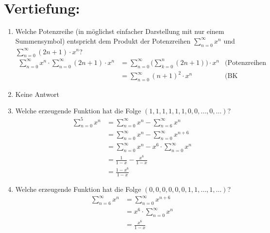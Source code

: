 



    \maketitle
    \section*{Vertiefung:}
    \begin{enumerate}[label=(\alph*)]
        \item Welche Potenzreihe (in möglichst einfacher Darstellung mit nur einem Summensymbol) 
        entspricht dem Produkt der Potenzreihen $\displaystyle\sum_{n=0}^{\infty} x^n$ und 
        $\displaystyle\sum_{n=0}^{\infty} (2n+1)\cdot x^n$?\\
        \begin{align*}
            \sum_{n=0}^{\infty} x^n \cdot \sum_{n=0}^{\infty} (2n+1)\cdot x^n &= 
            \sum_{n=0}^{\infty} \Bigg(\sum_{k=0}^{n} (2n+1)\Bigg) \cdot x^n &\textrm{(Potenzreihen Rechnenregeln)}\\
            &= \sum_{n=0}^{\infty} (n+1)^2 \cdot x^n &\textrm{(BK Proposition 3.B)}
        \end{align*}

        \item Keine Antwort

        \item Welche erzeugende Funktion hat die Folge $(1, 1, 1, 1, 1, 1, 0, 0, \ldots , 0, \ldots)$?
        \begin{align*}
            \sum_{n=0}^{5} x^n
            &=\sum_{n=0}^{\infty} x^n - \sum_{n=6}^{\infty} x^n \\
            &=\sum_{n=0}^{\infty} x^n - \sum_{n=0}^{\infty} x^{n+6} \\
            &=\sum_{n=0}^{\infty} x^n - x^6 \cdot \sum_{n=0}^{\infty} x^n \\
            &=\frac{1}{1-x} - \frac{x^6}{1-x} \\
            &=\frac{1-x^6}{1-x}
        \end{align*}

        \item Welche erzeugende Funktion hat die Folge $(0, 0, 0, 0, 0, 0, 1, 1, \ldots , 1,\ldots)$?
        \begin{align*}
            \sum_{n=6}^{\infty} x^n
            &=\sum_{n=0}^{\infty} x^{n+6} \\
            &=x^6\cdot\sum_{n=0}^{\infty} x^n \\
            &=\frac{x^6}{1-x}
        \end{align*}


\end{enumerate}
